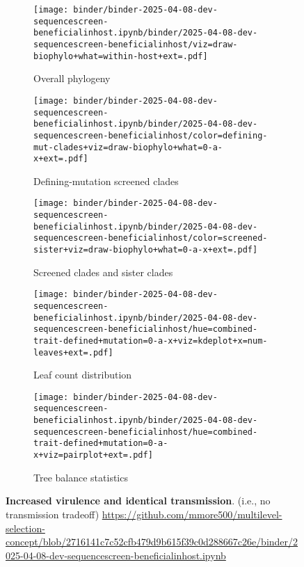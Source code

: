 \begin{figure*}[htbp]
  \centering
  \begin{subfigure}{0.32\textwidth}
    \centering
    \texttt{[image: binder/binder-2025-04-08-dev-sequencescreen-beneficialinhost.ipynb/binder/2025-04-08-dev-sequencescreen-beneficialinhost/viz=draw-biophylo+what=within-host+ext=.pdf]}
    \caption{Overall phylogeny}
    \label{fig:dev-sequencescreen-beneficialinhost:overall_phylogeny}
  \end{subfigure}
  \hfill
  \begin{subfigure}{0.32\textwidth}
    \centering
    \texttt{[image: binder/binder-2025-04-08-dev-sequencescreen-beneficialinhost.ipynb/binder/2025-04-08-dev-sequencescreen-beneficialinhost/color=defining-mut-clades+viz=draw-biophylo+what=0-a-x+ext=.pdf]}
    \caption{Defining-mutation screened clades}
    \label{fig:dev-sequencescreen-beneficialinhost:defining_mut_clades}
  \end{subfigure}
  \hfill
  \begin{subfigure}{0.32\textwidth}
    \centering
    \texttt{[image: binder/binder-2025-04-08-dev-sequencescreen-beneficialinhost.ipynb/binder/2025-04-08-dev-sequencescreen-beneficialinhost/color=screened-sister+viz=draw-biophylo+what=0-a-x+ext=.pdf]}
    \caption{Screened clades and sister clades}
    \label{fig:dev-sequencescreen-beneficialinhost:screened_sister}
  \end{subfigure}

  \vspace{0.5cm} %

  \begin{subfigure}{0.54\textwidth}
    \centering
    \texttt{[image: binder/binder-2025-04-08-dev-sequencescreen-beneficialinhost.ipynb/binder/2025-04-08-dev-sequencescreen-beneficialinhost/hue=combined-trait-defined+mutation=0-a-x+viz=kdeplot+x=num-leaves+ext=.pdf]}
    \caption{Leaf count distribution}
    \label{fig:dev-sequencescreen-beneficialinhost:leaf_count}
  \end{subfigure}
  \hfill
  \begin{subfigure}{0.44\textwidth}
    \centering
    \texttt{[image: binder/binder-2025-04-08-dev-sequencescreen-beneficialinhost.ipynb/binder/2025-04-08-dev-sequencescreen-beneficialinhost/hue=combined-trait-defined+mutation=0-a-x+viz=pairplot+ext=.pdf]}
    \caption{Tree balance statistics}
    \label{fig:dev-sequencescreen-beneficialinhost:tree_balance}
  \end{subfigure}

  \caption{\textbf{Increased virulence and identical transmission}. (i.e., no transmission tradeoff) \url{https://github.com/mmore500/multilevel-selection-concept/blob/2716141c7c52cfb479d9b615f39c0d288667c26e/binder/2025-04-08-dev-sequencescreen-beneficialinhost.ipynb}}
  \label{fig:dev-sequencescreen-beneficialinhost}
\end{figure*}
